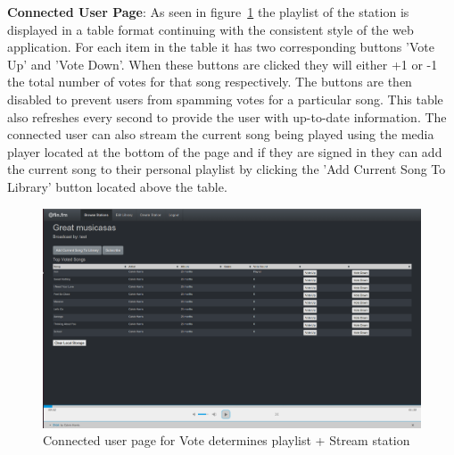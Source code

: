 \documentclass[a4paper, 12pt]{report}
\begin{document}
\textbf{Connected User Page}: As seen in figure~\ref{station-type-1-listener} the playlist of the station is displayed in a table format continuing with the consistent style of the web application. For each item in the table it has two corresponding buttons 'Vote Up' and 'Vote Down'. When these buttons are clicked they will either +1 or -1 the total number of votes for that song respectively. The buttons are then disabled to prevent users from spamming votes for a particular song. This table also refreshes every second to provide the user with up-to-date information.
The connected user can also stream the current song being played using the media player located at the bottom of the page and if they are signed in they can add the current song to their personal playlist by clicking the 'Add Current Song To Library' button located above the table.
\begin{figure}[H]
  \centering
    \includegraphics[width=1.0\textwidth]{screenshots/station-type-1-listener.png}
    \caption{Connected user page for Vote determines playlist + Stream station}
    \label{station-type-1-listener}
\end{figure}
\end{document}

